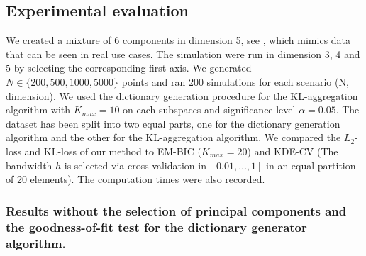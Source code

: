 \subsection{Experimental evaluation}

We created a mixture of 6 components in dimension 5, see , which mimics data that can be seen in real use cases. The simulation were run in dimension 3, 4 and 5 by selecting the corresponding first axis. We generated $N\in\{200, 500, 1000, 5000\}$ points and ran 200 simulations for each scenario (N, dimension). We used the dictionary generation procedure for the KL-aggregation algorithm with $K_{max} = 10$ on each subspaces and significance level $\alpha=0.05$. The dataset has been split into two equal parts, one for the dictionary generation algorithm and the other for the KL-aggregation algorithm. We compared the $L_2$-loss and KL-loss of our method to EM-BIC ($K_{max} = 20$) and KDE-CV (The bandwidth $h$ is selected via cross-validation in $[0.01, \dots, 1]$ in an equal partition of 20 elements). The computation times were also recorded. 

\subsubsection{ Results without the selection of principal components and the goodness-of-fit test for the dictionary generator algorithm.}

